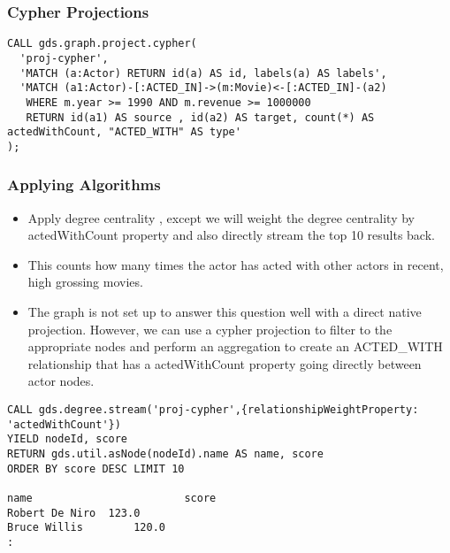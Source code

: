 \begin{frame}[fragile]\frametitle{Cypher Projections}

\begin{lstlisting}
CALL gds.graph.project.cypher(
  'proj-cypher',
  'MATCH (a:Actor) RETURN id(a) AS id, labels(a) AS labels',
  'MATCH (a1:Actor)-[:ACTED_IN]->(m:Movie)<-[:ACTED_IN]-(a2)
   WHERE m.year >= 1990 AND m.revenue >= 1000000
   RETURN id(a1) AS source , id(a2) AS target, count(*) AS actedWithCount, "ACTED_WITH" AS type'
);
\end{lstlisting}

\end{frame}

\begin{frame}[fragile]\frametitle{Applying Algorithms}

\begin{itemize}
\item Apply degree centrality , except we will weight the degree centrality by actedWithCount property and also directly stream the top 10 results back. 
\item This counts how many times the actor has acted with other actors in recent, high grossing movies.
\item The graph is not set up to answer this question well with a direct native projection. However, we can use a cypher projection to filter to the appropriate nodes and perform an aggregation to create an ACTED\_WITH relationship that has a actedWithCount property going directly between actor nodes.
\end{itemize}

\begin{lstlisting}
CALL gds.degree.stream('proj-cypher',{relationshipWeightProperty: 'actedWithCount'})
YIELD nodeId, score
RETURN gds.util.asNode(nodeId).name AS name, score
ORDER BY score DESC LIMIT 10

name						score
Robert De Niro 	123.0
Bruce Willis 		120.0
:
\end{lstlisting}

\end{frame}

